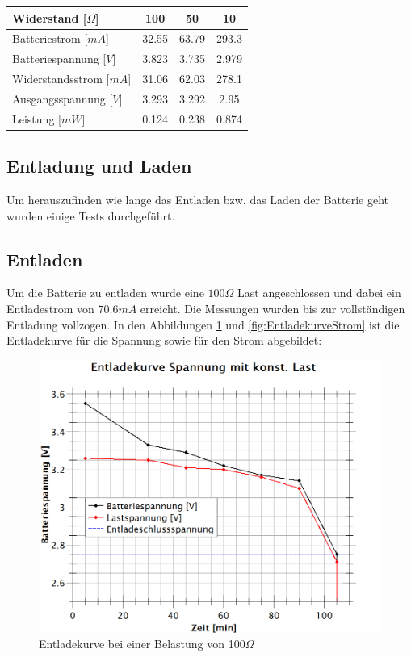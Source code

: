 \begin{table}[hp]
\centering
\label{messungen_Energie}
\begin{tabular}{|l|c|c|c|}
\hline
Widerstand [$\Omega$]     & 100   & 50    & 10    \\ \hline
Batteriestrom [$mA$]    & 32.55 & 63.79 & 293.3 \\ \hline
Batteriespannung [$V$] & 3.823 & 3.735 & 2.979 \\ \hline
Widerstandsstrom [$mA$] & 31.06 & 62.03 & 278.1 \\ \hline
Ausgangsspannung [$V$]  & 3.293 & 3.292 & 2.95  \\ \hline
Leistung [$mW$]  & 0.124 & 0.238 & 0.874  \\ \hline
\end{tabular}
\end{table}

\subsection{Entladung und Laden}

Um herauszufinden wie lange das Entladen bzw. das Laden der Batterie geht wurden einige Tests durchgeführt.

\subsection*{Entladen}
Um die Batterie zu entladen wurde eine $100\Omega$ Last angeschlossen und dabei ein Entladestrom von $70.6mA$ erreicht. Die Messungen wurden bis zur vollständigen Entladung vollzogen. 
In den Abbildungen \ref{fig:EntladekurveSpannung} und  \ref{fig:EntladekurveStrom} ist die Entladekurve für die Spannung sowie für den Strom abgebildet:

\begin{figure}[h]
	\centering
	\includegraphics[width=\textwidth]{graphics/EnladekurveSpannung.png}
	\caption{Entladekurve bei einer Belastung von 100$\Omega$}
	\label{fig:EntladekurveSpannung}
\end{figure}

